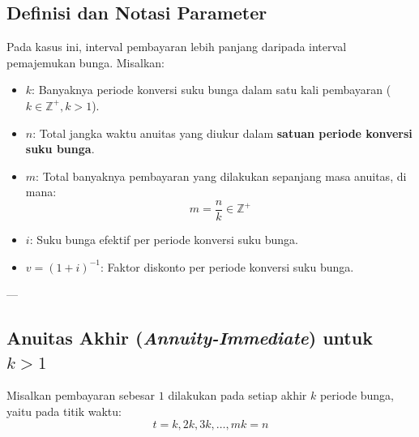 \documentclass[11pt,a4paper]{article}
\begin{document}
\subsection{Definisi dan Notasi Parameter}
Pada kasus ini, interval pembayaran lebih panjang daripada interval pemajemukan bunga. Misalkan:
\begin{itemize}[leftmargin=1.5em]
    \item $k$: Banyaknya periode konversi suku bunga dalam satu kali pembayaran ($k \in \mathbb{Z}^+, k > 1$).
    \item $n$: Total jangka waktu anuitas yang diukur dalam \textbf{satuan periode konversi suku bunga}.
    \item $m$: Total banyaknya pembayaran yang dilakukan sepanjang masa anuitas, di mana:
    \begin{equation}
        m = \frac{n}{k} \in \mathbb{Z}^+
    \end{equation}
    \item $i$: Suku bunga efektif per periode konversi suku bunga.
    \item $v = (1+i)^{-1}$: Faktor diskonto per periode konversi suku bunga.
\end{itemize}

---

\subsection{Anuitas Akhir (\textit{Annuity-Immediate}) untuk \texorpdfstring{$k > 1$}{k > 1}}

Misalkan pembayaran sebesar $1$ dilakukan pada setiap akhir $k$ periode bunga, yaitu pada titik waktu:
\begin{equation*}
    t = k, 2k, 3k, \dots, mk = n
\end{equation*}
\end{document}
